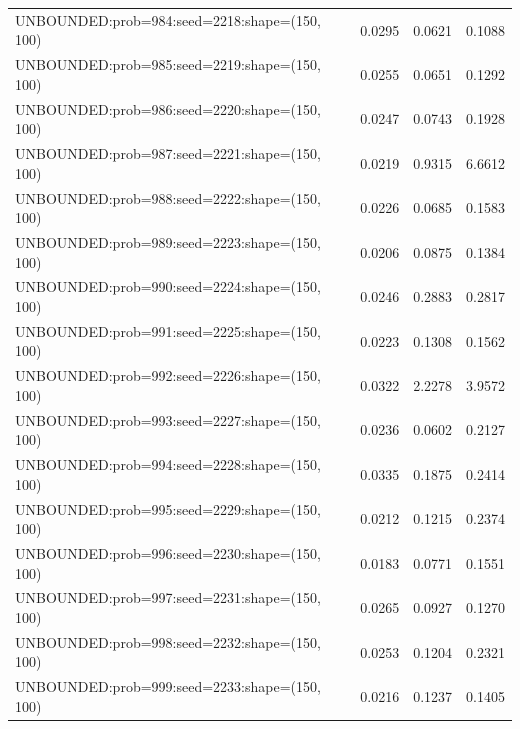 \begin{longtable}{lccc}
UNBOUNDED:prob=984:seed=2218:shape=(150, 100) &   0.0295 &  0.0621 &  0.1088 \\
UNBOUNDED:prob=985:seed=2219:shape=(150, 100) &   0.0255 &  0.0651 &  0.1292 \\
UNBOUNDED:prob=986:seed=2220:shape=(150, 100) &   0.0247 &  0.0743 &  0.1928 \\
UNBOUNDED:prob=987:seed=2221:shape=(150, 100) &   0.0219 &  0.9315 &  6.6612 \\
UNBOUNDED:prob=988:seed=2222:shape=(150, 100) &   0.0226 &  0.0685 &  0.1583 \\
UNBOUNDED:prob=989:seed=2223:shape=(150, 100) &   0.0206 &  0.0875 &  0.1384 \\
UNBOUNDED:prob=990:seed=2224:shape=(150, 100) &   0.0246 &  0.2883 &  0.2817 \\
UNBOUNDED:prob=991:seed=2225:shape=(150, 100) &   0.0223 &  0.1308 &  0.1562 \\
UNBOUNDED:prob=992:seed=2226:shape=(150, 100) &   0.0322 &  2.2278 &  3.9572 \\
UNBOUNDED:prob=993:seed=2227:shape=(150, 100) &   0.0236 &  0.0602 &  0.2127 \\
UNBOUNDED:prob=994:seed=2228:shape=(150, 100) &   0.0335 &  0.1875 &  0.2414 \\
UNBOUNDED:prob=995:seed=2229:shape=(150, 100) &   0.0212 &  0.1215 &  0.2374 \\
UNBOUNDED:prob=996:seed=2230:shape=(150, 100) &   0.0183 &  0.0771 &  0.1551 \\
UNBOUNDED:prob=997:seed=2231:shape=(150, 100) &   0.0265 &  0.0927 &  0.1270 \\
UNBOUNDED:prob=998:seed=2232:shape=(150, 100) &   0.0253 &  0.1204 &  0.2321 \\
UNBOUNDED:prob=999:seed=2233:shape=(150, 100) &   0.0216 &  0.1237 &  0.1405 \\
\end{longtable}
